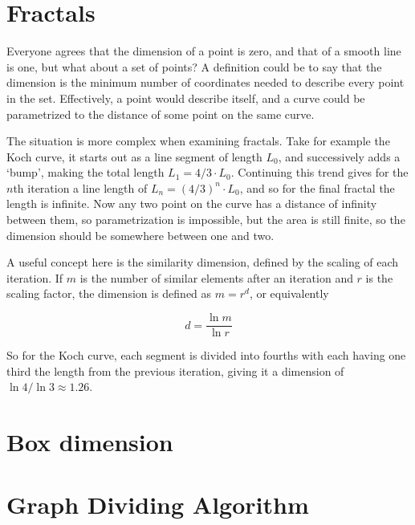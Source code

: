 \section{Fractals}
\label{sec:fractals}

Everyone agrees that the dimension of a point is zero, and that of a smooth line is one, but what about a set of points? A definition could be to say that the dimension is the minimum number of coordinates needed to describe every point in the set. Effectively, a point would describe itself, and a curve could be parametrized to the distance of some point on the same curve.

The situation is more complex when examining fractals. Take for example the Koch curve, it starts out as a line segment of length $L_0$, and successively adds a `bump', making the total length $L_1 = 4/3 \cdot L_0$. Continuing this trend gives for the $n$th iteration a line length of $L_n = {(4 / 3)}^n \cdot L_0$, and so for the final fractal the length is infinite. Now any two point on the curve has a distance of infinity between them, so parametrization is impossible, but the area is still finite, so the dimension should be somewhere between one and two.

A useful concept here is the similarity dimension, defined by the scaling of each iteration. If $m$ is the number of similar elements after an iteration and $r$ is the scaling factor, the dimension is defined as $m = r^d$, or equivalently

\begin{equation}
	d = \frac{\ln m}{\ln r}
\end{equation}

So for the Koch curve, each segment is divided into fourths with each having one third the length from the previous iteration, giving it a dimension of $\ln 4 / \ln 3 \approx 1.26$.


\section{Box dimension}
\label{sec:boxdimension}

\section{Graph Dividing Algorithm}
\label{sec:GraphDivisonAlgorithm}

